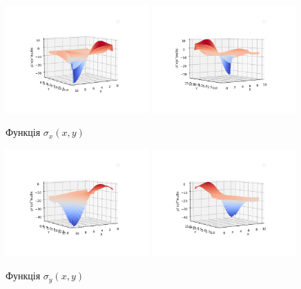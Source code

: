\begin{figure}[h!]
    \begin{center}
        \includegraphics[width=0.49\textwidth, scale=1]{images/results/static_2/sigma_x_1.png}
        \includegraphics[width=0.49\textwidth, scale=1]{images/results/static_2/sigma_x_2.png}
        \caption{Функція $\sigma_x(x, y)$}\label{static_2_sigma_x_1}
    \end{center}
\end{figure}
\begin{figure}[h!]
    \begin{center}
        \includegraphics[width=0.49\textwidth, scale=1]{images/results/static_2/sigma_y_1.png}
        \includegraphics[width=0.49\textwidth, scale=1]{images/results/static_2/sigma_y_2.png}
        \caption{Функція $\sigma_y(x, y)$}\label{static_2_sigma_y_1}
    \end{center}
\end{figure}
